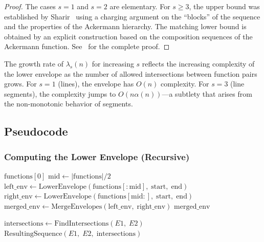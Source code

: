 \begin{proof}
The cases $s = 1$ and $s = 2$ are elementary. For $s \geq 3$, the upper bound was established by Sharir~\cite{sharir1995} using a charging argument on the ``blocks'' of the sequence and the properties of the Ackermann hierarchy. The matching lower bound is obtained by an explicit construction based on the composition sequences of the Ackermann function. See~\cite[Chapters~2--4]{sharir1995} for the complete proof.
\end{proof}

\begin{observation}
The growth rate of $\lambda_s(n)$ for increasing $s$ reflects the increasing complexity of the lower envelope as the number of allowed intersections between function pairs grows. For $s = 1$ (lines), the envelope has $O(n)$ complexity. For $s = 3$ (line segments), the complexity jumps to $O(n \alpha(n))$---a subtlety that arises from the non-monotonic behavior of segments.
\end{observation}

\subsection{Pseudocode}

\subsubsection*{Computing the Lower Envelope (Recursive)}
\begin{algorithm}[ht]
\label{alg:lower_envelope_recursive}
\begin{algorithmic}[1]
        \State \Return $\text{functions}[0]$
    \EndIf
    \State $\text{mid} \gets |\text{functions}| / 2$
    \State $\text{left\_env} \gets \text{LowerEnvelope}(\text{functions}[:\text{mid}],\; \text{start},\; \text{end})$
    \State $\text{right\_env} \gets \text{LowerEnvelope}(\text{functions}[\text{mid}:],\; \text{start},\; \text{end})$
    \State $\text{merged\_env} \gets \text{MergeEnvelopes}(\text{left\_env},\; \text{right\_env})$
    \State \Return $\text{merged\_env}$
\EndFunction

    \State $\text{intersections} \gets \text{FindIntersections}(E1,\; E2)$
    \State \Return $\text{ResultingSequence}(E1,\; E2,\; \text{intersections})$
\EndFunction
\end{algorithmic}
\end{algorithm}

